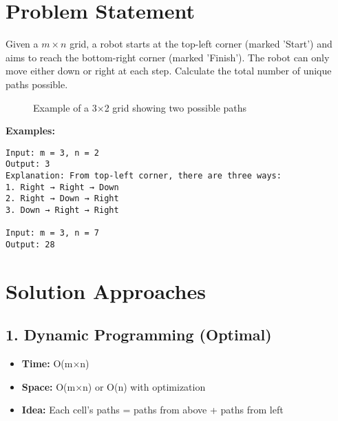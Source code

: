 

\label{problem:unique_paths}

\section*{Problem Statement}
Given a \(m \times n\) grid, a robot starts at the top-left corner (marked 'Start') and aims to reach the bottom-right corner (marked 'Finish'). The robot can only move either down or right at each step. Calculate the total number of unique paths possible.

\begin{figure}[h]
    \centering
    \caption{Example of a 3×2 grid showing two possible paths}
    \label{fig:unique_paths}
\end{figure}

\textbf{Examples:}
\begin{verbatim}
Input: m = 3, n = 2
Output: 3
Explanation: From top-left corner, there are three ways:
1. Right → Right → Down
2. Right → Down → Right
3. Down → Right → Right

Input: m = 3, n = 7
Output: 28
\end{verbatim}

\section*{Solution Approaches}

\subsection*{1. Dynamic Programming (Optimal)}
\begin{itemize}
    \item \textbf{Time:} O(m×n)
    \item \textbf{Space:} O(m×n) or O(n) with optimization
    \item \textbf{Idea:} Each cell's paths = paths from above + paths from left
\end{itemize}

